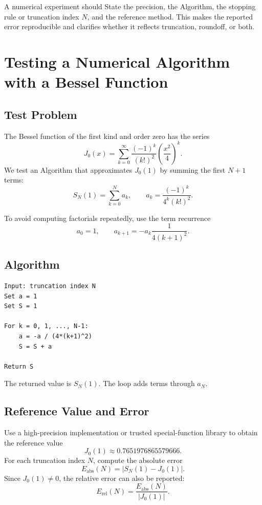 \documentclass[a4paper, 10pt, onepage]{elegantbook}
\begin{document}
{A numerical experiment should State the precision, the Algorithm,
the stopping rule or truncation index \(N\), and the reference method.
This makes the reported error reproducible and clarifies whether it
reflects truncation, roundoff, or both.

\section{Testing a Numerical Algorithm with a Bessel Function}

\noindent

\lstset{
  basicstyle=\ttfamily\small,
  breaklines=true,
  frame=single,
  columns=fullflexible
}

\subsection{Test Problem}

The Bessel function of the first kind and order zero has the series
\[
J_0(x)
=
\sum_{k=0}^{\infty}
\frac{(-1)^k}{(k!)^2}
\left(\frac{x^2}{4}\right)^k.
\]
We test an Algorithm that approximates \(J_0(1)\) by summing the first
\(N+1\) terms:
\[
S_N(1)=\sum_{k=0}^{N}a_k,
\qquad
a_k=\frac{(-1)^k}{4^k(k!)^2}.
\]

To avoid computing factorials repeatedly, use the term recurrence
\[
a_0=1,\qquad
a_{k+1}=-a_k\frac{1}{4(k+1)^2}.
\]

\subsection{Algorithm}

\noindent

\begin{lstlisting}
Input: truncation index N
Set a = 1
Set S = 1

For k = 0, 1, ..., N-1:
    a = -a / (4*(k+1)^2)
    S = S + a

Return S
\end{lstlisting}

The returned value is \(S_N(1)\). The loop adds terms through \(a_N\).

\subsection{Reference Value and Error}

\noindent

Use a high-precision implementation or trusted special-function
library to obtain the reference value
\[
J_0(1)\approx 0.7651976865579666.
\]
For each truncation index \(N\), compute the absolute error
\[
E_{\mathrm{abs}}(N)
=
\left|S_N(1)-J_0(1)\right|.
\]
Since \(J_0(1)\ne 0\), the relative error can also be reported:
\[
E_{\mathrm{rel}}(N)
=
\frac{E_{\mathrm{abs}}(N)}{|J_0(1)|}.
\]

}
\end{document}
